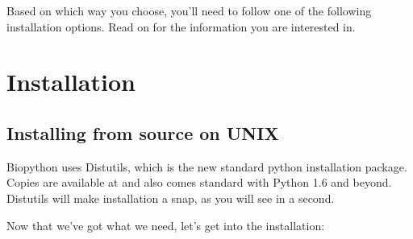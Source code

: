 \documentclass{report}
\begin{document}
Based on which way you choose, you'll need to follow one of the following installation options. Read on for the information you are interested in.

\section{Installation}

\subsection{Installing from source on UNIX}
\label{sec:unix_install}

Biopython uses Distutils, which is the new standard python installation package. Copies are available at  and also comes standard with Python 1.6 and beyond. Distutils will make installation a snap, as you will see in a second.


Now that we've got what we need, let's get into the installation:
\end{document}

